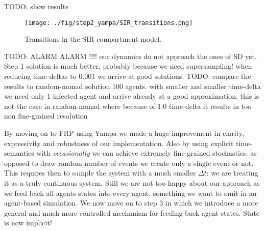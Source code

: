 TODO: show results
\begin{figure}
	\centering
	\texttt{[image: ./fig/step2\_yampa/SIR\_transitions.png]}
	\caption{Transitions in the SIR compartment model.}
	\label{fig:sir_transitions}
\end{figure}

TODO: ALARM ALARM !!!! our dynamics do not approach the ones of SD yet, Step 1 solution is much better, probably because we need supersampling! when reducing time-deltas to 0.001 we arrive at good solutions.
TODO: compare the results to random-monad solution 100 agents. with smaller and smaller time-delta we need only 1 infected agent and arrive already at a good approximation. this is not the case in random-monad where because of 1.0 time-delta it results in too non fine-grained resolution

By moving on to FRP using Yampa we made a huge improvement in clarity, expressivity and robustness of our implementation. Also by using explicit time-semantics with \textit{occasionally} we can achieve extremely fine grained stochastics: as opposed to draw random number of events we create only a single event or not. This requires then to sample the system with a much smaller $\Delta t$: we are treating it as a truly continuous system. Still we are not too happy about our approach as we feed back all agents states into every agent, something we want to omit in an agent-based simulation. We now move on to step 3 in which we introduce a more general and much more controlled mechanism for feeding back agent-states. State is now implicit!
